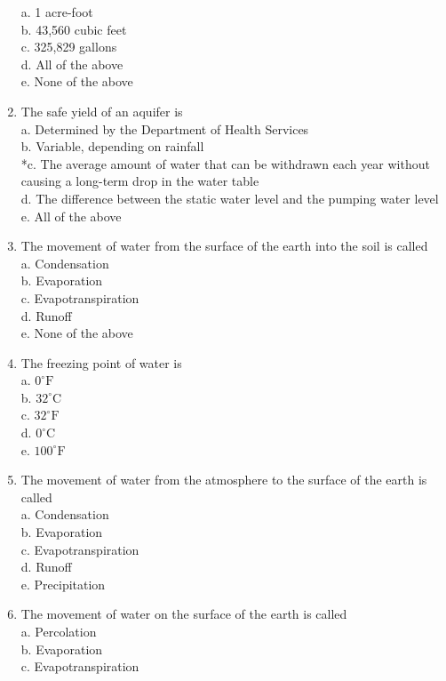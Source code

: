 \begin{enumerate}
a. 1 acre-foot\\
b. 43,560 cubic feet\\
c. 325,829 gallons\\
d. All of the above\\
e. None of the above\\
\item The safe yield of an aquifer is\\
a. Determined by the Department of Health Services\\
b. Variable, depending on rainfall\\
*c. The average amount of water that can be withdrawn each year without causing a long-term drop in the water table\\
d. The difference between the static water level and the pumping water level\\
e. All of the above\\
\item The movement of water from the surface of the earth into the soil is called\\
a. Condensation\\
b. Evaporation\\
c. Evapotranspiration\\
d. Runoff\\
e. None of the above\\
\item The freezing point of water is\\
a. $0^{\circ} \mathrm{F}$\\
b. $32^{\circ} \mathrm{C}$\\
c. $32^{\circ} \mathrm{F}$\\
d. $0^{\circ} \mathrm{C}$\\
e. $100^{\circ} \mathrm{F}$\\
\item The movement of water from the atmosphere to the surface of the earth is called\\
a. Condensation\\
b. Evaporation\\
c. Evapotranspiration\\
d. Runoff\\
e. Precipitation\\
\item The movement of water on the surface of the earth is called\\
a. Percolation\\
b. Evaporation\\
c. Evapotranspiration\\

\end{enumerate}
